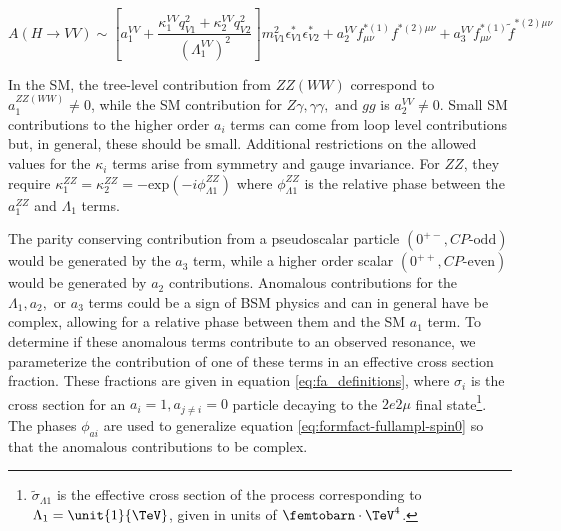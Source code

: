 \begin{equation}
A(H\to VV) \sim
\left[ a_{1}^{VV}
+ \frac{\kappa_1^{VV}q_{V1}^2 + \kappa_2^{VV} q_{V2}^{2}}{\left(\Lambda_{1}^{VV} \right)^{2}} \right]
m_{V1}^2 \epsilon_{V1}^* \epsilon_{V2}^*
+ a_{2}^{VV}  f_{\mu \nu}^{*(1)}f^{*(2)\mu\nu}
+ a_{3}^{VV}   f^{*(1)}_{\mu \nu} {\tilde f}^{*(2)\mu\nu}
\label{eq:formfact-fullampl-spin0}
\end{equation}

In the SM, the tree-level contribution from $ZZ \left(WW\right)$ correspond to $a_{1}^{ZZ \left(WW\right)} \neq 0$, while the SM contribution for $Z\gamma, \gamma\gamma, \text{ and } gg$ is $a_{2}^{VV} \neq 0$. Small SM contributions to the higher order $a_{i}$ terms can come from loop level contributions but, in general, these should be small. Additional restrictions on the allowed values for the $\kappa_{i}$ terms arise from symmetry and gauge invariance. For $ZZ$, they require $\kappa_{1}^{ZZ} = \kappa_{2}^{ZZ} = - \text{exp}\left(-i\phi_{\Lambda1}^{ZZ}\right)$ where $\phi_{\Lambda1}^{ZZ}$ is the relative phase between the $a_{1}^{ZZ}$ and $\Lambda_{1}$ terms. 

The parity conserving contribution from a pseudoscalar particle $\left( 0^{+-}, CP\text{-odd} \right)$ would be generated by the $a_{3}$ term, while a higher order scalar $\left( 0^{++}, CP\text{-even} \right)$ would be generated by $a_{2}$ contributions. Anomalous contributions for the $\Lambda_{1}, a_{2}, \text{ or } a_{3}$ terms could be a sign of BSM physics and can in general have be complex, allowing for a relative phase between them and the SM $a_{1}$ term. To determine if these anomalous terms contribute to an observed resonance, we parameterize the contribution of one of these terms in an effective cross section fraction. These fractions are given in equation \eqref{eq:fa_definitions}, where $\sigma_{i}$ is the cross section for an $a_{i} = 1, a_{j\neq i} = 0$ particle decaying to the $2e2\mu$ final state\footnote{$\tilde{\sigma}_{\Lambda{1}}$ is the effective cross section of the process corresponding to $\Lambda_{1} = \unit{1}{\TeV}$, given in units of $\femtobarn\cdot\TeV^{4}$.}. The phases $\phi_{ai}$ are used to generalize equation \eqref{eq:formfact-fullampl-spin0} so that the anomalous contributions to be complex.

